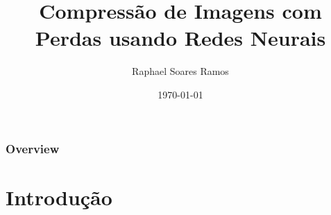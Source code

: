 \documentclass{beamer}
\title[Trabalho de Graduação 1]{Compressão de Imagens com Perdas usando Redes Neurais} %
\author[Raphael Soares Ramos]{Raphael Soares Ramos} %
\institute[UnB] %
{
Universidade de Brasília \\ %
\medskip
\textit{raphael.soares.1996@gmail.com} %
}
\date{\today} %
\begin{document}
\begin{frame}
\titlepage %
\end{frame}

\begin{frame}[allowframebreaks]
\frametitle{Overview} %
\tableofcontents %
\end{frame}


\section{Introdução}
\end{document}
